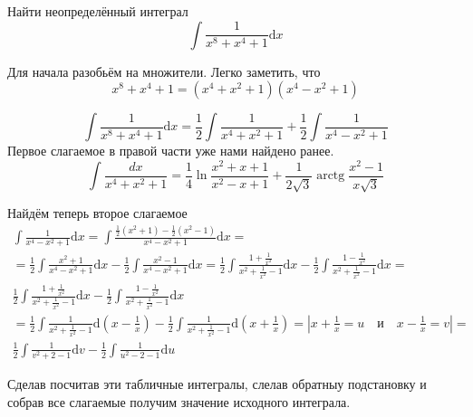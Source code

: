 Найти неопределённый интеграл
\begin{equation}
		\int \frac{1}{x^8+x^4+1}\mathrm{d}x
\end{equation}

Для начала разобьём на множители. Легко заметить, что 
\[ x^8+x^4+1=\left(x^4+x^2+1\right)\left(x^4-x^2+1\right)
\]

\[
\int \frac{1}{x^8+x^4+1}\mathrm{d}x = \frac{1}{2}\int \frac{1}{x^4+x^2+1} +\frac{1}{2}\int \frac{1}{x^4-x^2+1}
\]
Первое слагаемое в правой части уже нами найдено ранее.
\[	\int \frac{d x}{x^{4}+x^{2}+1}=\frac{1}{4} \ln \frac{x^{2}+x+1}{x^{2}-x+1}+\frac{1}{2 \sqrt{3}} \operatorname{arctg} \frac{x^{2}-1}{x \sqrt{3}}	
\]

Найдём теперь второе слагаемое
\[
\begin{aligned}
\int \frac{1}{x^4-x^2+1}\mathrm{d}x=\int \frac{\frac{1}{2}\left(x^{2}+1\right)-\frac{1}{2}\left(x^{2}-1\right)}{x^4-x^2+1}\mathrm{d}x=\\=\frac{1}{2}\int \frac{x^2+1}{x^4-x^2+1}\mathrm{d}x - \frac{1}{2}\int \frac{x^2-1}{x^4-x^2+1}\mathrm{d}x=\frac{1}{2}\int \frac{1+\frac{1}{x^2}}{x^2+\frac{1}{x^2}-1}\mathrm{d}x-\frac{1}{2}\int \frac{1-\frac{1}{x^2}}{x^2+\frac{1}{x^2}-1}\mathrm{d}x=\\\frac{1}{2}\int \frac{1+\frac{1}{x^2}}{x^2+\frac{1}{x^2}-1}\mathrm{d}x-\frac{1}{2}\int \frac{1-\frac{1}{x^2}}{x^2+\frac{1}{x^2}-1}\mathrm{d}x\\=\frac{1}{2}\int \frac{1}{x^2+\frac{1}{x^2}-1}\mathrm{d}\left(x-\frac{1}{x}\right)-\frac{1}{2}\int \frac{1}{x^2+\frac{1}{x^2}-1}\mathrm{d}\left(x+\frac{1}{x}\right)=\left|	x+\frac{1}{x}=u \quad \text{и} \quad x-\frac{1}{x}=v\right|=\\\frac{1}{2}\int \frac{1}{v^2+2-1}\mathrm{d}v-\frac{1}{2}\int \frac{1}{u^2-2-1}\mathrm{d}u
\end{aligned}
\]

Сделав посчитав эти табличные интегралы, слелав обратныу подстановку и собрав все слагаемые получим значение исходного интеграла.